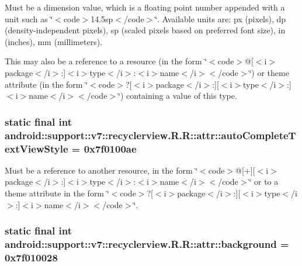 Must be a dimension value, which is a floating point number appended with a unit such as \char`\"{}$<$code$>$14.5sp$<$/code$>$\char`\"{}. Available units are: px (pixels), dp (density-independent pixels), sp (scaled pixels based on preferred font size), in (inches), mm (millimeters). 

This may also be a reference to a resource (in the form \char`\"{}$<$code$>$@\mbox{[}$<$i$>$package$<$/i$>$:\mbox{]}$<$i$>$type$<$/i$>$:$<$i$>$name$<$/i$>$$<$/code$>$\char`\"{}) or theme attribute (in the form \char`\"{}$<$code$>$?\mbox{[}$<$i$>$package$<$/i$>$:\mbox{]}\mbox{[}$<$i$>$type$<$/i$>$:\mbox{]}$<$i$>$name$<$/i$>$$<$/code$>$\char`\"{}) containing a value of this type. \hypertarget{classandroid_1_1support_1_1v7_1_1recyclerview_1_1_r_1_1attr_cd1e549a1eae7cf8190d85fabb5fc7a2}{
\subsubsection[{autoCompleteTextViewStyle}]{\setlength{\rightskip}{0pt plus 5cm}static final int android::support::v7::recyclerview.R.R::attr::autoCompleteTextViewStyle = 0x7f0100ae}}
\label{classandroid_1_1support_1_1v7_1_1recyclerview_1_1_r_1_1attr_cd1e549a1eae7cf8190d85fabb5fc7a2}


Must be a reference to another resource, in the form \char`\"{}$<$code$>$@\mbox{[}+\mbox{]}\mbox{[}$<$i$>$package$<$/i$>$:\mbox{]}$<$i$>$type$<$/i$>$:$<$i$>$name$<$/i$>$$<$/code$>$\char`\"{} or to a theme attribute in the form \char`\"{}$<$code$>$?\mbox{[}$<$i$>$package$<$/i$>$:\mbox{]}\mbox{[}$<$i$>$type$<$/i$>$:\mbox{]}$<$i$>$name$<$/i$>$$<$/code$>$\char`\"{}. \hypertarget{classandroid_1_1support_1_1v7_1_1recyclerview_1_1_r_1_1attr_d403726df75c3c9728fa4a91c58241dd}{
\subsubsection[{background}]{\setlength{\rightskip}{0pt plus 5cm}static final int android::support::v7::recyclerview.R.R::attr::background = 0x7f010028}}
\label{classandroid_1_1support_1_1v7_1_1recyclerview_1_1_r_1_1attr_d403726df75c3c9728fa4a91c58241dd}


